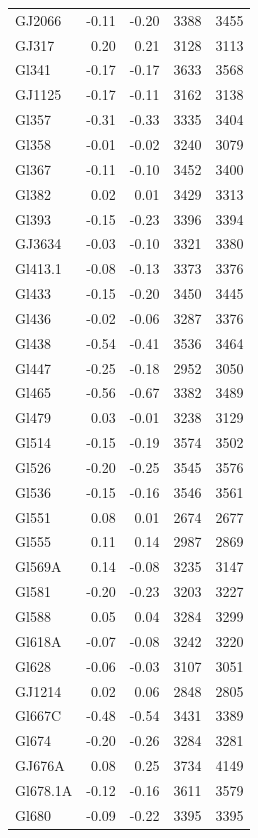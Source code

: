 \documentclass[referee]{aa}
\begin{document}
\begin{table}[]
{\begin{tabular}{ l r r r r}
GJ2066 & -0.11 & -0.20 & 3388 & 3455 \\
GJ317 & 0.20 & 0.21 & 3128 & 3113 \\
Gl341 & -0.17 & -0.17 & 3633 & 3568 \\
GJ1125 & -0.17 & -0.11 & 3162 & 3138 \\
Gl357 & -0.31 & -0.33 & 3335 & 3404 \\
Gl358 & -0.01 & -0.02 & 3240 & 3079 \\
Gl367 & -0.11 & -0.10 & 3452 & 3400 \\
Gl382 & 0.02 & 0.01 & 3429 & 3313 \\
Gl393 & -0.15 & -0.23 & 3396 & 3394 \\
GJ3634 & -0.03 & -0.10 & 3321 & 3380 \\
Gl413.1 & -0.08 & -0.13 & 3373 & 3376 \\
Gl433 & -0.15 & -0.20 & 3450 & 3445 \\
Gl436 & -0.02 & -0.06 & 3287 & 3376 \\
Gl438 & -0.54 & -0.41 & 3536 & 3464 \\
Gl447 & -0.25 & -0.18 & 2952 & 3050 \\
Gl465 & -0.56 & -0.67 & 3382 & 3489 \\
Gl479 & 0.03 & -0.01 & 3238 & 3129 \\
Gl514 & -0.15 & -0.19 & 3574 & 3502 \\
Gl526 & -0.20 & -0.25 & 3545 & 3576 \\
Gl536 & -0.15 & -0.16 & 3546 & 3561 \\
Gl551 & 0.08 & 0.01 & 2674 & 2677 \\
Gl555 & 0.11 & 0.14 & 2987 & 2869 \\
Gl569A & 0.14 & -0.08 & 3235 & 3147 \\
Gl581 & -0.20 & -0.23 & 3203 & 3227 \\
Gl588 & 0.05 & 0.04 & 3284 & 3299 \\
Gl618A & -0.07 & -0.08 & 3242 & 3220 \\
Gl628 & -0.06 & -0.03 & 3107 & 3051 \\
GJ1214 & 0.02 & 0.06 & 2848 & 2805 \\
Gl667C & -0.48 & -0.54 & 3431 & 3389 \\
Gl674 & -0.20 & -0.26 & 3284 & 3281 \\
GJ676A & 0.08 & 0.25 & 3734 & 4149 \\
Gl678.1A & -0.12 & -0.16 & 3611 & 3579 \\
Gl680 & -0.09 & -0.22 & 3395 & 3395 \\

\end{tabular}}
\end{table}
\end{document}
